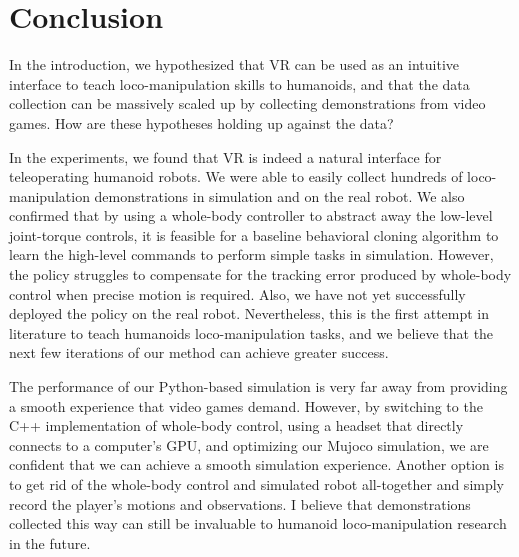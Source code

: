 \chapter{Conclusion}

In the introduction, we hypothesized that VR can be used as an intuitive interface to teach loco-manipulation skills to humanoids, and that the data collection can be massively scaled up by collecting demonstrations from video games. How are these hypotheses holding up against the data?

In the experiments, we found that VR is indeed a natural interface for teleoperating humanoid robots. We were able to easily collect hundreds of loco-manipulation demonstrations in simulation and on the real robot. We also confirmed that by using a whole-body controller to abstract away the low-level joint-torque controls, it is feasible for a baseline behavioral cloning algorithm to learn the high-level commands to perform simple tasks in simulation. However, the policy struggles to compensate for the tracking error produced by whole-body control when precise motion is required. Also, we have not yet successfully deployed the policy on the real robot. Nevertheless, this is the first attempt in literature to teach humanoids loco-manipulation tasks, and we believe that the next few iterations of our method can achieve greater success. 

The performance of our Python-based simulation is very far away from providing a smooth experience that video games demand. However, by switching to the C++ implementation of whole-body control, using a headset that directly connects to a computer's GPU, and optimizing our Mujoco simulation, we are confident that we can achieve a smooth simulation experience. Another option is to get rid of the whole-body control and simulated robot all-together and simply record the player's motions and observations. I believe that demonstrations collected this way can still be invaluable to humanoid loco-manipulation research in the future.
